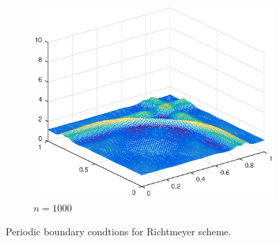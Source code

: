 \begin{figure}[h!]
\begin{subfigure}[t]{0.48\textwidth}
        \centering
        \includegraphics[width=\textwidth]{images/sol_ri_1000_per.eps}
        \caption{$n=1000$}
        \label{fig:100}
    \end{subfigure}
    \caption{Periodic boundary condtions for Richtmeyer scheme.}
    \label{fig:2DSolutions_ri}
\end{figure}
